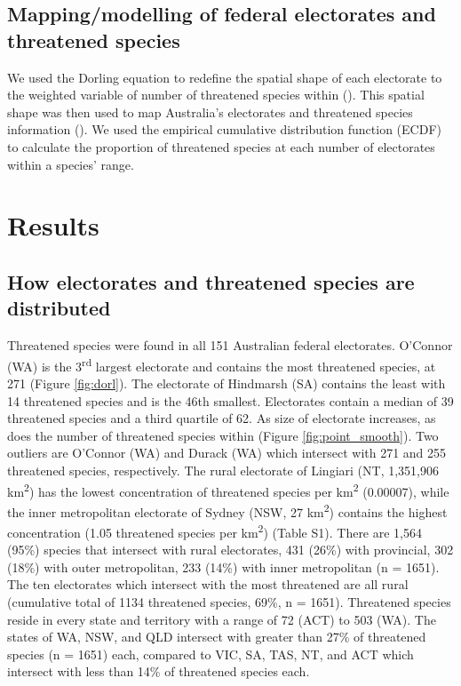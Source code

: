 \documentclass[a4paper,11pt]{article}
\begin{document}
\subsection{Mapping/modelling of federal electorates and threatened species}

We used the Dorling equation to redefine the spatial shape of each electorate to the weighted variable of number of threatened species within (\cite{jeworutzkiCartogramCreateCartograms2020}). This spatial shape was then used to map Australia's electorates and threatened species information (\cite{hahnTmapMakingMaps}). We used the empirical cumulative distribution function (ECDF) to calculate the proportion of threatened species at each number of electorates within a species' range.

\section{Results}

\subsection{How electorates and threatened species are distributed}

Threatened species were found in all 151 Australian federal electorates. O'Connor (WA) is the 3\textsuperscript{rd} largest electorate and contains the most threatened species, at 271 (Figure \ref{fig:dorl}). The electorate of Hindmarsh (SA) contains the least with 14 threatened species and is the 46th smallest. Electorates contain a median of 39 threatened species and a third quartile of 62. As size of electorate increases, as does the number of threatened species within (Figure \ref{fig:point_smooth}). Two outliers are O'Connor (WA) and Durack (WA) which intersect with 271 and 255 threatened species, respectively. The rural electorate of Lingiari (NT, 1,351,906 km\textsuperscript{2}) has the lowest concentration of threatened species per km\textsuperscript{2} (0.00007), while the inner metropolitan electorate of Sydney (NSW, 27 km\textsuperscript{2}) contains the highest concentration (1.05 threatened species per km\textsuperscript{2}) (Table S1). There are 1,564 (95\%) species that intersect with rural electorates, 431 (26\%) with provincial, 302 (18\%) with outer metropolitan, 233 (14\%) with inner metropolitan (n = 1651). The ten electorates which intersect with the most threatened are all rural (cumulative total of 1134 threatened species, 69\%, n = 1651). Threatened species reside in every state and territory with a range of 72 (ACT) to 503 (WA). The states of WA, NSW, and QLD intersect with greater than 27\% of threatened species (n = 1651) each, compared to VIC, SA, TAS, NT, and ACT which intersect with less than 14\% of threatened species each.
\end{document}
